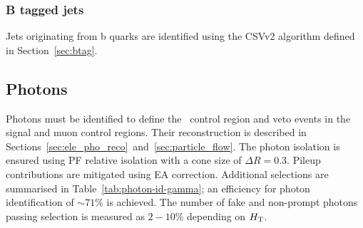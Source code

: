 \subsubsection{B tagged jets}

Jets originating from b quarks are identified using the CSVv2 algorithm defined in Section~\ref{sec:btag}. 

\subsection{Photons}

Photons must be identified to define the \gj~control region and veto events in the signal and
muon control regions. Their reconstruction is described in Sections~\ref{sec:ele_pho_reco}~and~\ref{sec:particle_flow}. The photon isolation is 
ensured using PF relative isolation with a cone size of $\Delta R = 0.3$. Pileup contributions 
are mitigated using EA correction. Additional selections are summarised 
in Table~\ref{tab:photon-id-gamma}; an efficiency for photon identification of $\sim71\%$
is achieved. The number of fake and non-prompt photons passing selection is measured as $2-10\%$ depending on $\mbox{$H_\text{T}$}$.

